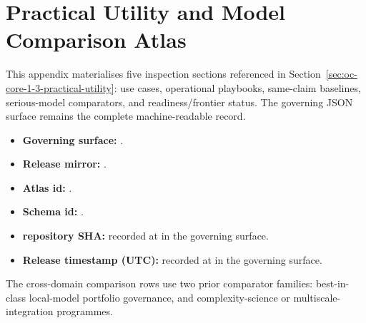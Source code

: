 \section{Practical Utility and Model Comparison Atlas}
\label{sec:oc-core-1-3-practical-utility-atlas}

This appendix materialises five inspection sections referenced in
Section~\ref{sec:oc-core-1-3-practical-utility}: use cases, operational
playbooks, same-claim baselines, serious-model comparators, and
readiness/frontier status. The governing JSON surface remains the complete
machine-readable record.

\begin{itemize}
\item \textbf{Governing surface:}
      .
\item \textbf{Release mirror:}
      .
\item \textbf{Atlas id:} .
\item \textbf{Schema id:} .
\item \textbf{repository SHA:} recorded at  in the governing surface.
\item \textbf{Release timestamp (UTC):} recorded at  in the governing surface.
\end{itemize}
The cross-domain comparison rows use two prior comparator families:
best-in-class local-model portfolio governance, and complexity-science or
multiscale-integration programmes.

\begingroup
\footnotesize
\RaggedRight
\setlength{\emergencystretch}{1.2em}
\setlength{\tabcolsep}{2pt}
\setlength{\LTleft}{0pt}
\setlength{\LTright}{0pt}

\endgroup
